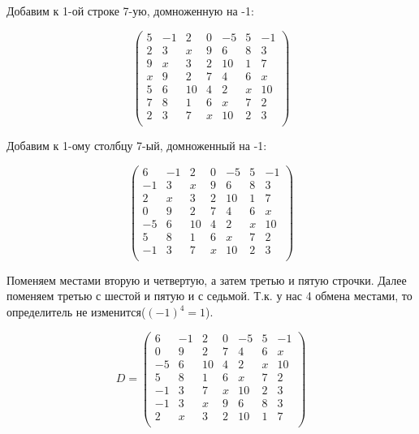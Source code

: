 	    Добавим к 1-ой строке 7-ую, домноженную на -1:
	    
	    \[
	    \begin{pmatrix}
	    5 & -1 & 2 & 0 & -5 & 5 & -1 \\
	    2 & 3 & x & 9 & 6 & 8 & 3 \\
	    9 & x & 3 & 2 & 10 & 1 & 7 \\
	    x & 9 & 2 & 7 & 4 & 6 & x \\
	    5 & 6 & 10 & 4 & 2 & x & 10 \\
	    7 & 8 & 1 & 6 & x & 7 & 2 \\
	    2 & 3 & 7 & x & 10 & 2 & 3 \\
	    \end{pmatrix}
	    \]
	    
	    Добавим к 1-ому столбцу 7-ый, домноженный на -1:
	    
	    \[
	    \begin{pmatrix}
	    6 & -1 & 2 & 0 & -5 & 5 & -1 \\
	    -1 & 3 & x & 9 & 6 & 8 & 3 \\
	    2 & x & 3 & 2 & 10 & 1 & 7 \\
	    0 & 9 & 2 & 7 & 4 & 6 & x \\
	    -5 & 6 & 10 & 4 & 2 & x & 10 \\
	    5 & 8 & 1 & 6 & x & 7 & 2 \\
	    -1 & 3 & 7 & x & 10 & 2 & 3 \\
	    \end{pmatrix}
	    \]  
	    
	    Поменяем местами вторую и четвертую, а затем третью и пятую строчки. Далее поменяем третью с шестой и пятую и с седьмой. Т.к. у нас 4 обмена местами, то определитель не изменится($(-1)^4 = 1$).
	    
	    \[ D = 
	    \begin{pmatrix}
	    6 & -1 & 2 & 0 & -5 & 5 & -1 \\
	    0 & 9 & 2 & 7 & 4 & 6 & x \\
	    -5 & 6 & 10 & 4 & 2 & x & 10 \\
	    5 & 8 & 1 & 6 & x & 7 & 2 \\
	    -1 & 3 & 7 & x & 10 & 2 & 3 \\
	    -1 & 3 & x & 9 & 6 & 8 & 3 \\
	    2 & x & 3 & 2 & 10 & 1 & 7 \\
	    \end{pmatrix}
	    \]  
	    

